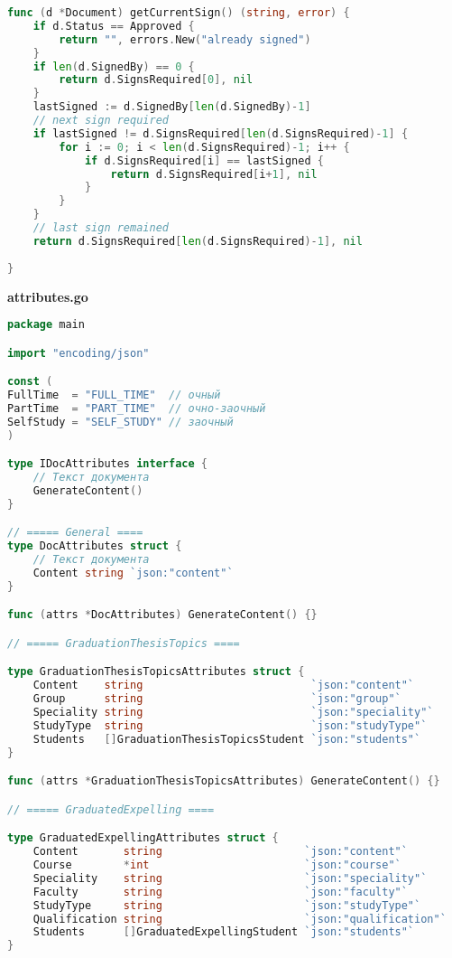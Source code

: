\begin{lstlisting}[language=Go]
func (d *Document) getCurrentSign() (string, error) {
	if d.Status == Approved {
		return "", errors.New("already signed")
	}
	if len(d.SignedBy) == 0 {
		return d.SignsRequired[0], nil
	}
	lastSigned := d.SignedBy[len(d.SignedBy)-1]
	// next sign required
	if lastSigned != d.SignsRequired[len(d.SignsRequired)-1] {
		for i := 0; i < len(d.SignsRequired)-1; i++ {
			if d.SignsRequired[i] == lastSigned {
				return d.SignsRequired[i+1], nil
			}
		}
	}
	// last sign remained
	return d.SignsRequired[len(d.SignsRequired)-1], nil
	
}

\end{lstlisting}

\textbf{attributes.go}

\begin{lstlisting}[language=Go]
package main

import "encoding/json"

const (
FullTime  = "FULL_TIME"  // очный
PartTime  = "PART_TIME"  // очно-заочный
SelfStudy = "SELF_STUDY" // заочный
)

type IDocAttributes interface {
	// Текст документа
	GenerateContent()
}

// ===== General ====
type DocAttributes struct {
	// Текст документа
	Content string `json:"content"`
}

func (attrs *DocAttributes) GenerateContent() {}

// ===== GraduationThesisTopics ====

type GraduationThesisTopicsAttributes struct {
	Content    string                          `json:"content"`
	Group      string                          `json:"group"`
	Speciality string                          `json:"speciality"`
	StudyType  string                          `json:"studyType"`
	Students   []GraduationThesisTopicsStudent `json:"students"`
}

func (attrs *GraduationThesisTopicsAttributes) GenerateContent() {}

// ===== GraduatedExpelling ====

type GraduatedExpellingAttributes struct {
	Content       string                      `json:"content"`
	Course        *int                        `json:"course"`
	Speciality    string                      `json:"speciality"`
	Faculty       string                      `json:"faculty"`
	StudyType     string                      `json:"studyType"`
	Qualification string                      `json:"qualification"`
	Students      []GraduatedExpellingStudent `json:"students"`
}


\end{lstlisting}
